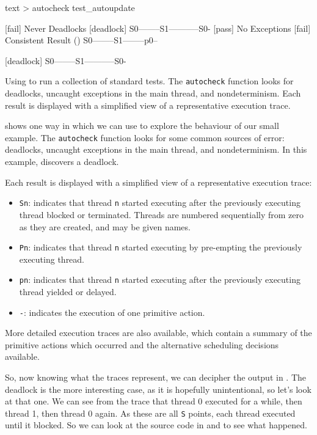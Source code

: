 \begin{listing}
\centering
\begin{cminted}{text}
> autocheck test_autoupdate

[fail] Never Deadlocks
        [deadlock] S0--------S1-----------S0-
[pass] No Exceptions
[fail] Consistent Result
        () S0--------S1--------p0--

        [deadlock] S0--------S1-----------S0-
\end{cminted}
\caption[Using \dejafu{} to run a collection of standard tests.]{Using \dejafu{} to run a collection of standard tests.  The \texttt{autocheck} function looks for deadlocks, uncaught exceptions in the main thread, and nondeterminism.  Each result is displayed with a simplified view of a representative execution trace.}\label{lst:autoupdate_example2}
\end{listing}

 shows one way in which we can use
\dejafu{} to explore the behaviour of our small example.  The
\verb|autocheck| function looks for some common sources of error:
deadlocks, uncaught exceptions in the main thread, and nondeterminism.
In this example, \dejafu{} discovers a deadlock.

Each result is displayed with a simplified view of a representative
execution trace:

\begin{itemize}
\item \verb|Sn|: indicates that thread \verb|n| started executing
  after the previously executing thread blocked or terminated.
  Threads are numbered sequentially from zero as they are created, and
  may be given names.
\item \verb|Pn|: indicates that thread \verb|n| started executing by
  pre-empting the previously executing thread.
\item \verb|pn|: indicates that thread \verb|n| started executing
  after the previously executing thread yielded or delayed.
\item \verb|-|: indicates the execution of one primitive action.
\end{itemize}

More detailed execution traces are also available, which contain a
summary of the primitive actions which occurred and the alternative
scheduling decisions available.

So, now knowing what the traces represent, we can decipher the output
in .  The deadlock is the more
interesting case, as it is hopefully unintentional, so let's look at
that one.  We can see from the trace that thread 0 executed for a
while, then thread 1, then thread 0 again.  As these are all \verb|S|
points, each thread executed until it blocked.  So we can look at the
source code in  and
 to see what happened.

